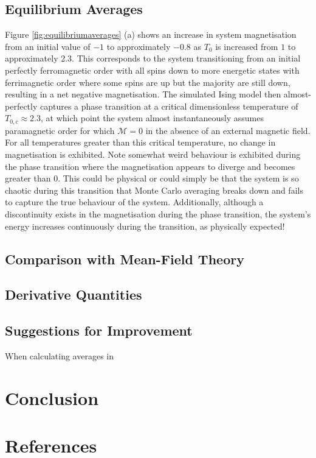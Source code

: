 \documentclass[11pt]{iopart}
\begin{document}
\subsection{Equilibrium Averages}
Figure \ref{fig:equilibriumaverages} (a) shows an increase in system magnetisation from an initial value of $-1$ to approximately $-0.8$ as $T_0$ is increased from $1$ to approximately 2.3. This corresponds to the system transitioning from an initial perfectly ferromagnetic order with all spins down to more energetic states with ferrimagnetic order where some spins are up but the majority are still down, resulting in a net negative magnetisation. The simulated Ising model then almost-perfectly captures a phase transition at a critical dimensionless temperature of $T_{0,c} \approx 2.3$, at which point the system almost instantaneously assumes paramagnetic order for which $\mathcal{M} = 0$ in the absence of an external magnetic field. For all temperatures greater than this critical temperature, no change in magnetisation is exhibited. Note somewhat weird behaviour is exhibited during the phase transition where the magnetisation appears to diverge and becomes greater than 0. This could be physical or could simply be that the system is so chaotic during this transition that Monte Carlo averaging breaks down and fails to capture the true behaviour of the system. Additionally, although a discontinuity exists in the magnetisation during the phase transition, the system's energy increases continuously during the transition, as physically expected!

\subsection{Comparison with Mean-Field Theory}


\subsection{Derivative Quantities}
 
 \subsection{Suggestions for Improvement}
 When calculating averages in 
 
\section{Conclusion}

\section*{References}


\end{document}
